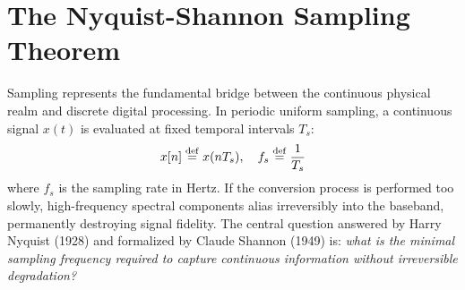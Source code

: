\documentclass[
  lang=english,
  accent=0055A4,      %
  circuits=true,      %
  qed=smiley          %
]{opalith}
\begin{document}
\section{The Nyquist-Shannon Sampling Theorem}
\label{sec:nyquist_shannon}

Sampling represents the fundamental bridge between the continuous physical realm and discrete digital processing. In periodic uniform sampling, a continuous signal $x(t)$ is evaluated at fixed temporal intervals $T_s$:
\begin{equation}
  x[n] \overset{\mathrm{def}}{=} x(n T_s), \quad f_s \overset{\mathrm{def}}{=} \frac{1}{T_s}
\end{equation}
where $f_s$ is the sampling rate in Hertz. If the conversion process is performed too slowly, high-frequency spectral components alias irreversibly into the baseband, permanently destroying signal fidelity. The central question answered by Harry Nyquist (1928) and formalized by Claude Shannon (1949) is: \textit{what is the minimal sampling frequency required to capture continuous information without irreversible degradation?}

\newpage
{}
\end{document}

